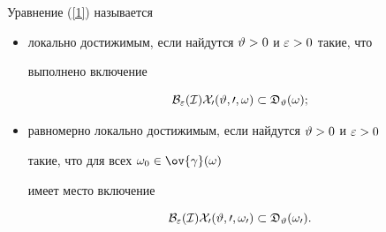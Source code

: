 \begin{defn}


\label{d1}


Уравнение (\ref{1}) называется


\begin{itemize}


\item[а)] локально достижимым, если найдутся $\vartheta>0$ и $\varepsilon>0$ такие, что


выполнено включение


$$


\cal B_{\ve}(I)X_0(\vt,0,\omega)\subset\frak D_{\vt}(\omega);


$$


\item[б)] равномерно локально достижимым, если найдутся $\vartheta>0$ и $\varepsilon>0$


такие, что для всех $\omega_0\in\ov{\gamma}(\omega)$


имеет место включение


$$


\cal B_{\ve}(I)X_0(\vt,0,\omega_0)\subset\frak D_{\vt}(\omega_0).


$$


\end{itemize}


\end{defn}





